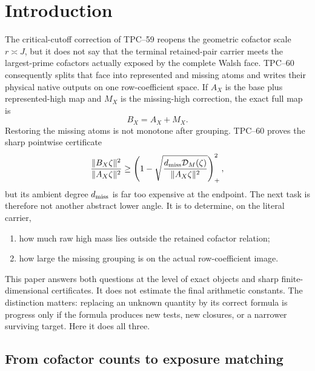 \section{Introduction}
\label{sec:tpc61-introduction}

The critical-cutoff correction of TPC--59 reopens the geometric cofactor
scale \(r\asymp J\), but it does not say that the terminal retained-pair
carrier meets the largest-prime cofactors actually exposed by the complete
Walsh face.  TPC--60 consequently splits that face into represented and
missing atoms and writes their physical native outputs on one row-coefficient
space.  If \(A_X\) is the base plus represented-high map and \(M_X\) is the
missing-high correction, the exact full map is
\begin{equation}
 B_X=A_X+M_X.
 \label{eq:tpc61-intro-full-map}
\end{equation}
Restoring the missing atoms is not monotone after grouping.  TPC--60 proves
the sharp pointwise certificate
\begin{equation}
 \frac{\|B_X\zeta\|^2}{\|A_X\zeta\|^2}
 \ge
 \left(
  1-\sqrt{
   \frac{d_{\rm miss}\mathcal D_M(\zeta)}{\|A_X\zeta\|^2}}
 \right)_+^2,
 \label{eq:tpc61-intro-ambient-certificate}
\end{equation}
but its ambient degree \(d_{\rm miss}\) is far too expensive at the
endpoint.  The next task is therefore not another abstract lower angle.  It
is to determine, on the literal carrier,
\begin{enumerate}[leftmargin=2.3em]
 \item how much raw high mass lies outside the retained cofactor relation;
 \item how large the missing grouping is on the actual row-coefficient image.
\end{enumerate}

This paper answers both questions at the level of exact objects and sharp
finite-dimensional certificates.  It does not estimate the final arithmetic
constants.  The distinction matters: replacing an unknown quantity by its
correct formula is progress only if the formula produces new tests, new
closures, or a narrower surviving target.  Here it does all three.

\subsection{From cofactor counts to exposure matching}

